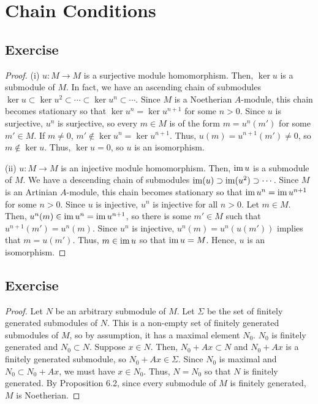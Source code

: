\section{Chain Conditions}

\subsection{Exercise}\label{6.1}

\begin{proof}
(i) $u : M \to M$ is a surjective module homomorphism. Then, $\ker u$ is a submodule of $M$. In fact, we have an ascending chain of submodules
$\ker u \subset \ker u^2 \subset \cdots \subset \ker u^n \subset \cdots$. Since $M$ is a Noetherian $A$-module, this chain becomes
stationary so that $\ker u^n = \ker u^{n+1}$ for some $n > 0$. Since $u$ is surjective, $u^n$ is surjective, so every $m \in M$ is of 
the form $m = u^n(m')$ for some $m' \in M$. If $m \neq 0$, $m' \not\in \ker u^n = \ker u^{n+1}$. Thus, $u(m) = u^{n+1}(m') \neq 0$, so 
$m \not\in \ker u$. Thus, $\ker u = 0$, so $u$ is an isomorphism.

(ii) $u : M \to M$ is an injective module homomorphism. Then, $\operatorname{im} u$ is a submodule of $M$. We have a descending chain of submodules 
$\operatorname{im}(u) \supset \operatorname{im}(u^2) \supset \cdots$. Since $M$ is an Artinian $A$-module, this chain becomes stationary so that $\operatorname{im} u^n = \operatorname{im} u^{n+1}$
for some $n > 0$. Since $u$ is injective, $u^n$ is injective for all $n > 0$. Let $m \in M$. Then, $u^n(m) \in \operatorname{im} u^n = \operatorname{im} u^{n+1}$, so
there is some $m' \in M$ such that $u^{n+1}(m') = u^n(m)$. Since $u^n$ is injective, $u^n(m) = u^n(u(m'))$ implies that $m = u(m')$. Thus,
$m \in \operatorname{im} u$ so that $\operatorname{im} u = M$. Hence, $u$ is an isomorphism.
\end{proof}

\subsection{Exercise}\label{6.2}

\begin{proof}
Let $N$ be an arbitrary submodule of $M$. Let $\Sigma$ be the set of finitely generated submodules of $N$. This is a non-empty set of finitely
generated submodules of $M$, so by assumption, it has a maximal element $N_0$. $N_0$ is finitely generated and $N_0 \subset N$. Suppose $x \in N$.
Then, $N_0 + Ax \subset N$ and $N_0 + Ax$ is a finitely generated submodule, so $N_0 + Ax \in \Sigma$. Since $N_0$ is maximal and 
$N_0 \subset N_0 + Ax$, we must have $x \in N_0$. Thus, $N = N_0$ so that $N$ is finitely generated. By Proposition 6.2, since every submodule
of $M$ is finitely generated, $M$ is Noetherian.
\end{proof}

